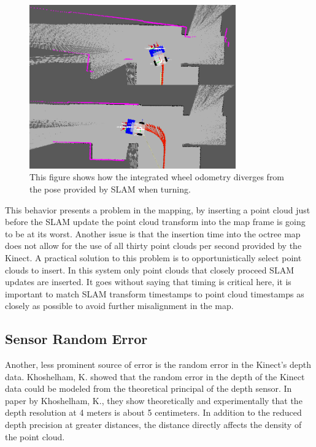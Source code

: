 \documentclass[12pt]{report}
\begin{document}
\begin{figure}[ht]
  \centering
  \includegraphics[width=3.5in,keepaspectratio]{uncertainty.png}
  \caption{This figure shows how the integrated wheel odometry diverges from the pose provided by SLAM when turning.}
  \label{fig:uncertainty}
\end{figure}

This behavior presents a problem in the mapping, by inserting a point cloud just before the SLAM update the point cloud transform into the map frame is going to be at its worst.  Another issue is that the insertion time into the octree map does not allow for the use of all thirty point clouds per second provided by the Kinect.  A practical solution to this problem is to opportunistically select point clouds to insert.  In this system only point clouds that closely proceed SLAM updates are inserted.  It goes without saying that timing is critical here, it is important to match SLAM transform timestamps to point cloud timestamps as closely as possible to avoid further misalignment in the map.

\subsection{Sensor Random Error}
Another, less prominent source of error is the random error in the Kinect's depth data.  Khoshelham, K. showed that the random error in the depth of the Kinect data could be modeled from the theoretical principal of the depth sensor.\cite{khoshelham2011accuracy}  In paper by Khoshelham, K., they show theoretically and experimentally that the depth resolution at 4 meters is about 5 centimeters.  In addition to the reduced depth precision at greater distances, the distance directly affects the density of the point cloud.
\end{document}
